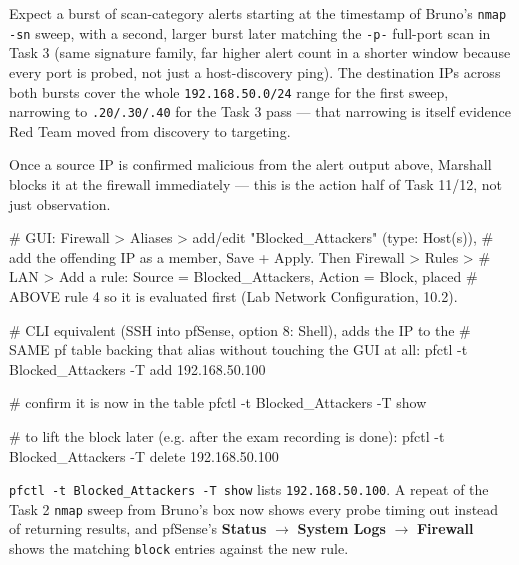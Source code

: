 \documentclass[11pt,a4paper]{article}
\begin{document}
\begin{expectbox}
Expect a burst of scan-category alerts starting at the timestamp of Bruno's
\texttt{nmap -sn} sweep, with a second, larger burst later matching the \texttt{-p-}
full-port scan in Task 3 (same signature family, far higher alert count in a shorter
window because every port is probed, not just a host-discovery ping). The destination
IPs across both bursts cover the whole \texttt{192.168.50.0/24} range for the first
sweep, narrowing to \texttt{.20/.30/.40} for the Task 3 pass --- that narrowing is
itself evidence Red Team moved from discovery to targeting.
\end{expectbox}

\begin{redbox}
Once a source IP is confirmed malicious from the alert output above, Marshall blocks it
at the firewall immediately --- this is the action half of Task 11/12, not just
observation.
\end{redbox}

\begin{cmdbox}
\begin{cmdverb}
# GUI: Firewall > Aliases > add/edit "Blocked_Attackers" (type: Host(s)),
# add the offending IP as a member, Save + Apply. Then Firewall > Rules >
# LAN > Add a rule: Source = Blocked_Attackers, Action = Block, placed
# ABOVE rule 4 so it is evaluated first (Lab Network Configuration, 10.2).

# CLI equivalent (SSH into pfSense, option 8: Shell), adds the IP to the
# SAME pf table backing that alias without touching the GUI at all:
pfctl -t Blocked_Attackers -T add 192.168.50.100

# confirm it is now in the table
pfctl -t Blocked_Attackers -T show

# to lift the block later (e.g. after the exam recording is done):
pfctl -t Blocked_Attackers -T delete 192.168.50.100
\end{cmdverb}
\end{cmdbox}

\begin{expectbox}
\texttt{pfctl -t Blocked\_Attackers -T show} lists \texttt{192.168.50.100}. A repeat
of the Task 2 \texttt{nmap} sweep from Bruno's box now shows every probe timing out
instead of returning results, and pfSense's \textbf{Status} $\to$ \textbf{System Logs}
$\to$ \textbf{Firewall} shows the matching \texttt{block} entries against the new rule.
\end{expectbox}
\end{document}

